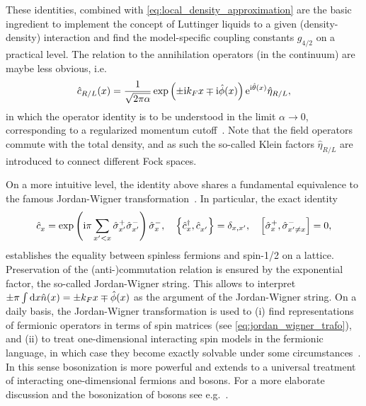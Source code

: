 These identities, combined with \cref{eq:local_density_approximation} are the basic ingredient to implement the concept of Luttinger liquids to a given (density-density) interaction and find the model-specific coupling constants $g_{4/2}$ on a practical level.
The relation to the annihilation operators (in the continuum) are maybe less obvious, i.e.
\begin{align}
    \hat c_{R/L}(x) = \frac1{\sqrt{2\pi\alpha}}\exp\left( \pm\mathrm i k_F x\mp\mathrm i\hat \phi(x) \right)\mathrm e^{\mathrm i\hat\theta(x)}\hat \eta_{R/L},
    \label{eq:bosonization_identity}
\end{align}
in which the operator identity is to be understood in the limit $\alpha\rightarrow0$, corresponding to a regularized momentum cutoff~\cite{Bruus2004}.
Note that the field operators commute with the total density, and as such the so-called Klein factors $\hat\eta_{R/L}$ are introduced to connect different Fock spaces.

On a more intuitive level, the identity above shares a fundamental equivalence to the famous Jordan-Wigner transformation~\cite{Jordan1928}.
In particular, the exact identity
\begin{align}
    \hat c^\pdag_x=\exp\brlr{\ri\pi\sum_{x'<x}\hat \sigma^+_{x'}\hat \sigma^-_{x'}}\hat \sigma^-_x
    ,\quad
    \anticommutator{\hat c^\dag_x,\hat c^\pdag_{x'}}=\delta_{x,x'}
    ,\quad
    \commutator{\hat \sigma^+_x,\hat \sigma^-_{x'\neq x}}=0
    ,
\end{align}
establishes the equality between spinless fermions and spin-1/2 on a lattice.
Preservation of the (anti-)commutation relation is ensured by the exponential factor, the so-called Jordan-Wigner string.
This allows to interpret $\pm\pi\int\mathrm d x\hat n(x) = \pm k_F x\mp\hat\phi(x)$ as the argument of the Jordan-Wigner string.
On a daily basis, the Jordan-Wigner transformation is used to (i) find representations of fermionic operators in terms of spin matrices (see \cref{eq:jordan_wigner_trafo}), and (ii) to treat one-dimensional interacting spin models in the fermionic language, in which case they become exactly solvable under some circumstances~\cite{Lieb1961}.
In this sense bosonization is more powerful and extends to a universal treatment of interacting one-dimensional fermions and bosons.
For a more elaborate discussion and the bosonization of bosons see e.g.~\cite{Cazalilla2004}.

